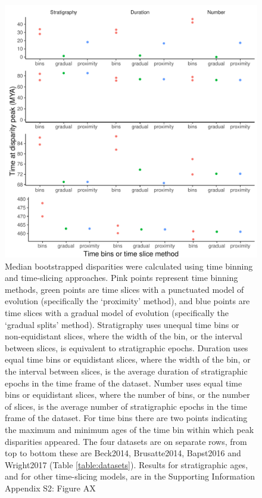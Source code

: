 \documentclass[12pt,a4paper]{article}
\begin{document}
  \begin{figure}[!htbp]
    \centering
    \includegraphics[width=1\linewidth, height=1\textheight, keepaspectratio]{figures/fig-peaks-epoch.pdf}
    \caption[Timing of peak disparity for four example datasets.]
    {Median bootstrapped disparities were calculated using time binning and time-slicing approaches. 
    Pink points represent time binning methods, green points are time slices with a punctuated model of evolution (specifically the `proximity' method), and blue points are time slices with a gradual model of evolution (specifically the `gradual splits' method). 
    Stratigraphy uses unequal time bins or non-equidistant slices, where the width of the bin, or the interval between slices, is equivalent to stratigraphic epochs. 
    Duration uses equal time bins or equidistant slices, where the width of the bin, or the interval between slices, is the average duration of stratigraphic epochs in the time frame of the dataset. 
    Number uses equal time bins or equidistant slices, where the number of bins, or the number of slices, is the average number of stratigraphic epochs in the time frame of the dataset. 
    For time bins there are two points indicating the maximum and minimum ages of the time bin within which peak disparities appeared.
    The four datasets are on separate rows, from top to bottom these are Beck2014, Brusatte2014, Bapst2016 and Wright2017 (Table \ref{table:datasets}).
    Results for stratigraphic ages, and for other time-slicing models, are in the Supporting Information Appendix S2: Figure AX} %
    \label{figure:peak1}
  \end{figure}
\end{document}
